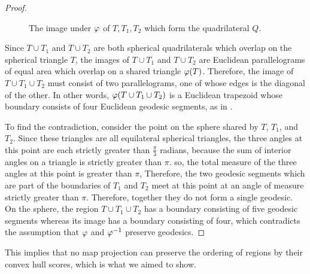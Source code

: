 \begin{proof}
		\begin{figure}[h]
			\centering
			
			\caption{The image under $\varphi$ of $T,T_1,T_2$ which form the quadrilateral $Q$.}
			\label{fig:sphtris_pl}
		\end{figure}
		

Since $T\cup T_1$ and $T\cup T_2$ are both spherical quadrilaterals which overlap on the spherical triangle $T$, the images of $T\cup T_1$ and $T\cup T_2$ are Euclidean parallelograms of equal area which overlap on a shared triangle $\varphi(T)$.
	Therefore, the image of $T\cup T_1\cup T_2$ must 
	consist of two parallelograms, one of whose 
	edges is the diagonal of the other. In other words, 
	$\varphi(T\cup T_1\cup T_2)$ is a Euclidean trapezoid 
	whose boundary consists of four Euclidean geodesic 
	segments, as in .
	
	To find the contradiction, consider the point on the sphere shared by $T$, $T_1$, and $T_2$.  Since these triangles are all equilateral spherical triangles, the three angles at this point are each strictly greater than $\tfrac{\pi}{3}$ radians, because the sum of interior angles on a triangle is strictly greater than $\pi$.  
	so, the total measure of the three angles at this point is greater than $\pi$,  Therefore, the two geodesic segments which are part of the boundaries of $T_1$ and $T_2$ meet at this point at an angle of measure strictly greater than 
	$\pi$. Therefore, together they do not form a single geodesic.  On the sphere, the region $T\cup T_1\cup T_2$ has a boundary consisting of five geodesic segments whereas its image has a boundary consisting of four, which contradicts the assumption that $\varphi$ and $\varphi^{-1}$ preserve geodesics.
\end{proof}

This implies that no map projection can preserve the ordering of regions by their convex hull scores, which is what we aimed to show.

